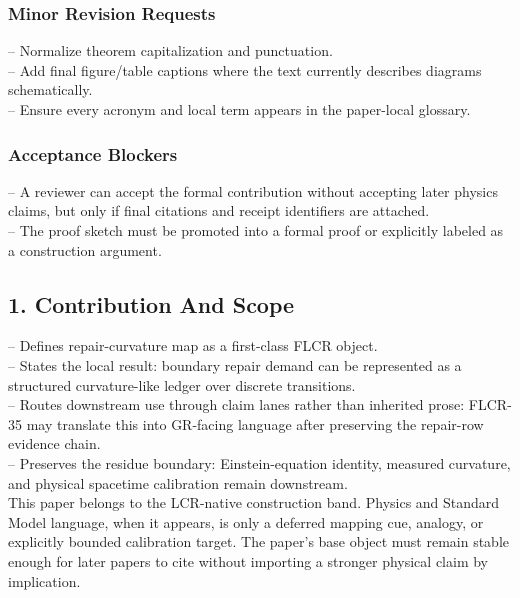 \documentclass[11pt]{article}
\begin{document}
\subsubsection*{Minor Revision Requests}

\noindent{}-- Normalize theorem capitalization and punctuation.\\
\noindent{}-- Add final figure/table captions where the text currently describes diagrams schematically.\\
\noindent{}-- Ensure every acronym and local term appears in the paper-local glossary.\\

\subsubsection*{Acceptance Blockers}

\noindent{}-- A reviewer can accept the formal contribution without accepting later physics claims, but only if final citations and receipt identifiers are attached.\\
\noindent{}-- The proof sketch must be promoted into a formal proof or explicitly labeled as a construction argument.\\


\subsection*{1. Contribution And Scope}

\noindent{}-- Defines repair-curvature map as a first-class FLCR object.\\
\noindent{}-- States the local result: boundary repair demand can be represented as a structured curvature-like ledger over discrete transitions.\\
\noindent{}-- Routes downstream use through claim lanes rather than inherited prose: FLCR-35 may translate this into GR-facing language after preserving the repair-row evidence chain.\\
\noindent{}-- Preserves the residue boundary: Einstein-equation identity, measured curvature, and physical spacetime calibration remain downstream.\\

This paper belongs to the LCR-native construction band. Physics and Standard Model language, when it appears, is only a deferred mapping cue, analogy, or explicitly bounded calibration target. The paper's base object must remain stable enough for later papers to cite without importing a stronger physical claim by implication.
\end{document}
